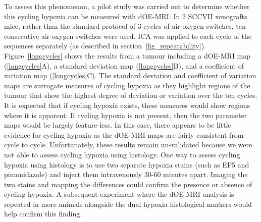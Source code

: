 To assess this phenomenon, a pilot study was carried out to determine whether this cycling hypoxia can be measured with \acs{dOE-MRI}.
In 2 SCCVII xenografts mice, rather than the standard protocol of 3 cycles of air-oxygen switches, ten consecutive air-oxygen switches were used.
\acs{ICA} was applied to each cycle of the sequences separately (as described in section~\ref{fig_repeatability}).
Figure~\ref{longcycles} shows the results from a tumour including a \acs{dOE-MRI} map (\ref{longcycles}A), a standard deviation map (\ref{longcycles}B), and a coefficient of variation map (\ref{longcycles}C).
The standard deviation and coefficient of variation maps are surrogate measures of cycling hypoxia as they highlight regions of the tumour that show the highest degree of deviation or variation over the ten cycles.
It is expected that if cycling hypoxia exists, these measures would show regions where it is apparent. 
If cycling hypoxia is not present, then the two parameter maps would be largely feature-less.
In this case, there appears to be little evidence for cycling hypoxia as the \acs{dOE-MRI} maps are fairly consistent from cycle to cycle.
Unfortunately, these results remain un-validated because we were not able to assess cycling hypoxia using histology.
One way to assess cycling hypoxia using histology is to use two separate hypoxia stains (such as EF5 and pimonidazole) and inject them intravenously 30-60 minutes apart.
Imaging the two stains and mapping the differences could confirm the presence or absence of cycling hypoxia. 
A subsequent experiment where the \acs{dOE-MRI} analysis is repeated in more animals alongside the dual hypoxia histological markers would help confirm this finding.

